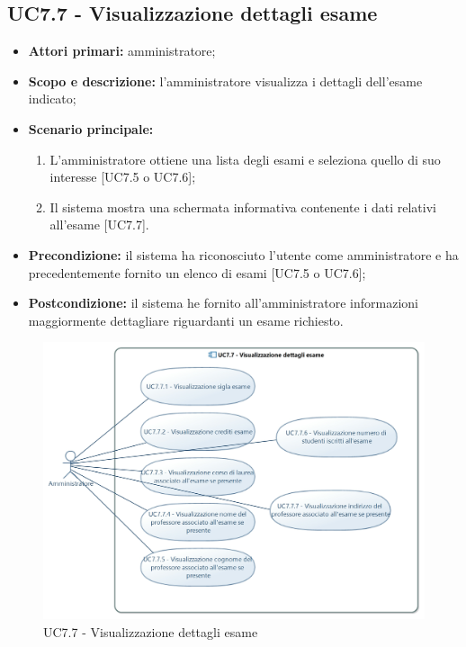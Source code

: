 \documentclass[AnalisiDeiRequisiti.tex]{subfiles}
\begin{document}
\subsection{UC7.7 - Visualizzazione dettagli esame}
\begin{itemize}
	\item \textbf{Attori primari:} amministratore;
	\item \textbf{Scopo e descrizione:} l'amministratore visualizza i dettagli dell'esame indicato;
	\item \textbf{Scenario principale:}
	\begin{enumerate}
		\item L'amministratore ottiene una lista degli esami e seleziona quello di suo interesse [UC7.5 o UC7.6];
		\item Il sistema mostra una schermata informativa contenente i dati relativi all'esame [UC7.7].
	\end{enumerate}
	\item \textbf{Precondizione:} il sistema ha riconosciuto l'utente come amministratore e ha precedentemente fornito un elenco di esami [UC7.5 o UC7.6]; 
	\item \textbf{Postcondizione:} il sistema he fornito all'amministratore informazioni maggiormente dettagliare riguardanti un esame richiesto.
\end{itemize}
\begin{figure}[H]
	\centering
	\includegraphics[width=1\linewidth]{UC7_7.jpg}
	\caption{UC7.7 - Visualizzazione dettagli esame}
	\label{fig:UC7.7 - Visualizzazione dettagli esame}
\end{figure}
\end{document}
